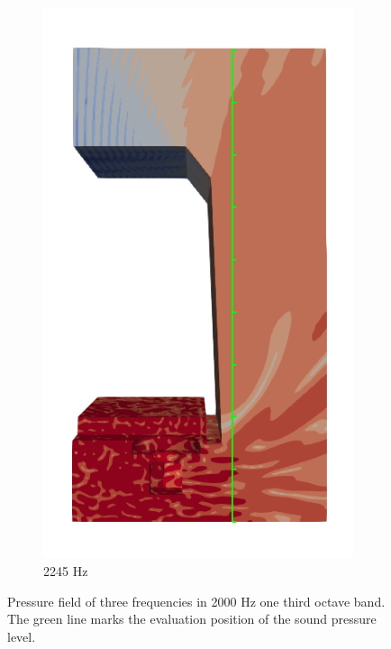 \begin{figure}[H]
\begin{subfigure}[b]{0.3\textwidth}
		\includegraphics[width=\linewidth]{fig/chap5/freq_steps/field_result_2245Hz.png}
		\caption{2245 Hz}
	\end{subfigure}
	\caption{Pressure field of three frequencies in 2000 Hz one third octave band. The green line marks the evaluation position of the sound pressure level.}
	\label{fig:pressure_field_solution}
\end{figure}

